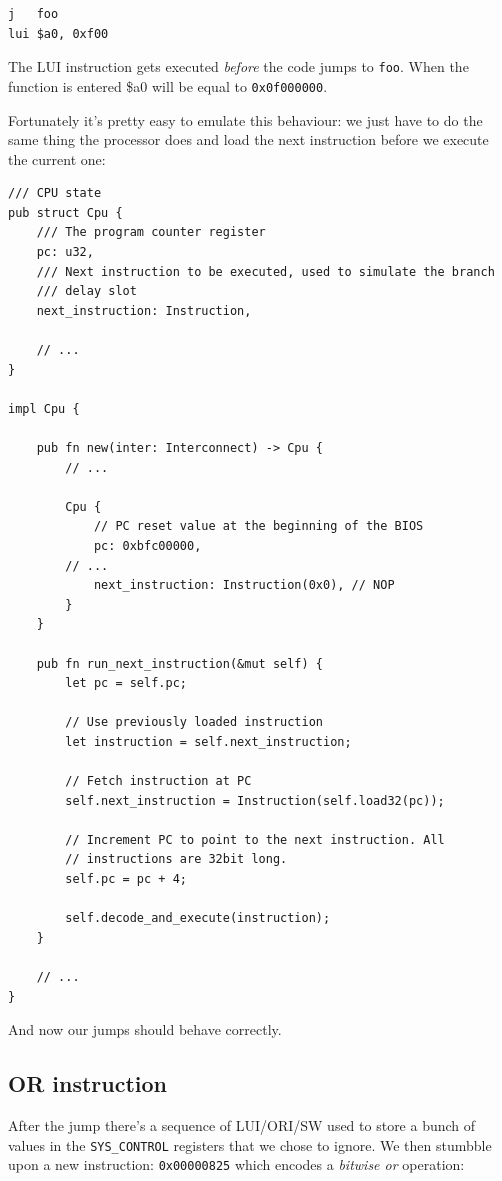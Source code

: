 \documentclass[a4paper]{article}
\newcommand{\code}[1] {\texttt{#1}}
\begin{document}
\begin{lstlisting}[language=assembly]
j   foo
lui $a0, 0xf00
\end{lstlisting}

The LUI instruction gets executed \emph{before} the code jumps to
\code{foo}. When the function is entered \$a0 will be equal to
\code{0x0f000000}.

Fortunately it's pretty easy to emulate this behaviour: we just have
to do the same thing the processor does and load the next instruction
before we execute the current one:

\begin{lstlisting}
/// CPU state
pub struct Cpu {
    /// The program counter register
    pc: u32,
    /// Next instruction to be executed, used to simulate the branch
    /// delay slot
    next_instruction: Instruction,

    // ...
}

impl Cpu {

    pub fn new(inter: Interconnect) -> Cpu {
        // ...

        Cpu {
            // PC reset value at the beginning of the BIOS
            pc: 0xbfc00000,
	    // ...
            next_instruction: Instruction(0x0), // NOP
        }
    }

    pub fn run_next_instruction(&mut self) {
        let pc = self.pc;

        // Use previously loaded instruction
        let instruction = self.next_instruction;

        // Fetch instruction at PC
        self.next_instruction = Instruction(self.load32(pc));

        // Increment PC to point to the next instruction. All
        // instructions are 32bit long.
        self.pc = pc + 4;

        self.decode_and_execute(instruction);
    }

    // ...
}
\end{lstlisting}

And now our jumps should behave correctly.

\subsection{OR instruction}

After the jump there's a sequence of LUI/ORI/SW used to store a bunch
of values in the \code{SYS\_CONTROL} registers that we chose to
ignore. We then stumbble upon a new instruction: \code{0x00000825}
which encodes a \emph{bitwise or} operation:
\end{document}
